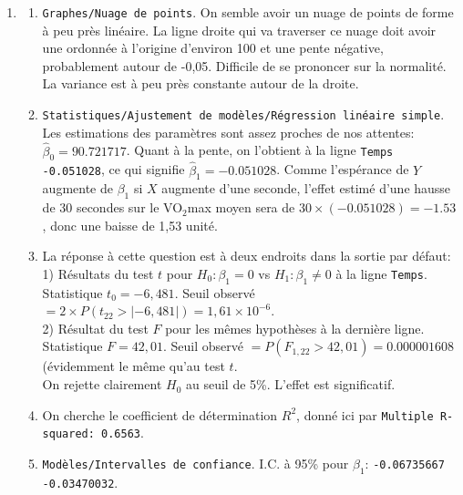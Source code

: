\documentclass[12pt]{article}
\begin{document}
{\begin{enumerate}
\item 
    \begin{enumerate}
    \item[(a)]  {\tt Graphes/Nuage de points}. On semble avoir  un nuage de points de forme à peu près linéaire. La ligne droite qui va traverser ce nuage doit avoir une ordonnée à l'origine d'environ 100 et une pente négative, probablement autour de -0,05. Difficile de se prononcer sur la normalité. La variance est à peu près constante autour de la droite.
    \item[(b)]  {\tt Statistiques/Ajustement de modèles/Régression linéaire simple}. 
     Les estimations des paramètres sont assez proches de nos attentes: $\hat\beta_0=90.721717$. Quant à la pente, on l'obtient à la ligne {\tt Temps       -0.051028}, ce qui signifie $\hat{\beta}_1=-0.051028$. Comme l'espérance de $Y$ augmente de $\beta_1$ si $X$ augmente d'une seconde, l'effet estimé d'une hausse de 30 secondes sur le VO$_2$max moyen sera de $30\times(-0.051028)=-1.53$, donc une baisse de 1,53 unité.
    \item[(c)] La réponse à cette question est à deux endroits dans la sortie par défaut: \\
        1) Résultats du test $t$ pour $H_0:\beta_1=0$ vs $H_1:\beta_1\neq0$ à la ligne {\tt Temps}. Statistique $t_0 = -6,481$. Seuil observé $=2\times P(t_22>|-6,481|)=1,61\times 10^{-6}$.\\
         2) Résultat du test $F$ pour les mêmes hypothèses à la dernière ligne. Statistique $F = 42,01$. Seuil observé $=P(F_{1,22}>42,01)=0.000001608$ (évidemment le même qu'au test $t$.\\
         On rejette clairement $H_0$ au seuil de 5\%. L'effet est significatif.
    \item[(d)] On cherche le coefficient de détermination $R^2$, donné ici par {\tt Multiple R-squared:  0.6563}.
    \item[(e)] {\tt Modèles/Intervalles de confiance}. I.C. à 95\% pour $\beta_1$:  {\tt -0.06735667  -0.03470032}.
        \newpage
        \vspace*{5mm}
        

\end{enumerate}
\end{enumerate}}
\end{document}
